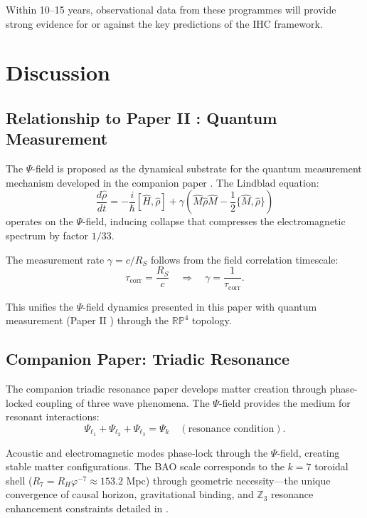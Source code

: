 Within 10--15 years, observational data from these programmes will provide strong evidence for or against the key predictions of the IHC framework.

\section{Discussion}

\subsection{Relationship to Paper II \citep{Peacock2026b_qm}: Quantum Measurement}

The $\Psi$-field is proposed as the dynamical substrate for the quantum measurement mechanism developed in the companion paper \citep{Peacock2026b_qm}. The Lindblad equation:
\begin{equation}
\frac{d\hat{\rho}}{dt} = -\frac{i}{\hbar}[\hat{H}, \hat{\rho}] + \gamma\left( \hat{M}\hat{\rho}\hat{M} - \frac{1}{2}\{\hat{M}, \hat{\rho}\} \right)
\end{equation}
operates on the $\Psi$-field, inducing collapse that compresses the electromagnetic spectrum by factor $1/33$.

The measurement rate $\gamma = c/R_S$ follows from the field correlation timescale:
\begin{equation}
\tau_{\text{corr}} = \frac{R_S}{c} \quad \Rightarrow \quad \gamma = \frac{1}{\tau_{\text{corr}}}.
\end{equation}

This unifies the $\Psi$-field dynamics presented in this paper with quantum measurement (Paper II \citep{Peacock2026b_qm}) through the $\mathbb{RP}^4$ topology.

\subsection{Companion Paper: Triadic Resonance \citep{Peacock2026d}}

The companion triadic resonance paper \citep{Peacock2026d} develops matter creation through phase-locked coupling of three wave phenomena. The $\Psi$-field provides the medium for resonant interactions:
\begin{equation}
\Psi_{\ell_1} + \Psi_{\ell_2} + \Psi_{\ell_3} = \Psi_k \quad (\text{resonance condition}).
\end{equation}

Acoustic and electromagnetic modes phase-lock through the $\Psi$-field, creating stable matter configurations. The BAO scale corresponds to the $k = 7$ toroidal shell ($R_7 = R_H\varphi^{-7} \approx 153.2$ Mpc) through geometric necessity---the unique convergence of causal horizon, gravitational binding, and $\mathbb{Z}_3$ resonance enhancement constraints detailed in \citep{Peacock2026d}.

